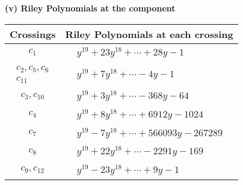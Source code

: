 \documentclass[1p]{elsarticle_modified}
\theoremstyle{definition}
\begin{document}
\newpage\renewcommand{\arraystretch}{1}
\flushleft \textbf{(v) Riley Polynomials at the component}\newline \\
\begin{tabular}{m{50pt}|m{274pt}}
Crossings & \hspace{64pt}Riley Polynomials at each crossing \\
\hline $$\begin{aligned}c_{1}\end{aligned}$$&$\begin{aligned}
&y^{19}+23 y^{18}+\cdots+28 y-1
\end{aligned}$\\
\hline $$\begin{aligned}c_{2},c_{5},c_{6}\\c_{11}\end{aligned}$$&$\begin{aligned}
&y^{19}+7 y^{18}+\cdots-4 y-1
\end{aligned}$\\
\hline $$\begin{aligned}c_{3},c_{10}\end{aligned}$$&$\begin{aligned}
&y^{19}+3 y^{18}+\cdots-368 y-64
\end{aligned}$\\
\hline $$\begin{aligned}c_{4}\end{aligned}$$&$\begin{aligned}
&y^{19}+8 y^{18}+\cdots+6912 y-1024
\end{aligned}$\\
\hline $$\begin{aligned}c_{7}\end{aligned}$$&$\begin{aligned}
&y^{19}-7 y^{18}+\cdots+566093 y-267289
\end{aligned}$\\
\hline $$\begin{aligned}c_{8}\end{aligned}$$&$\begin{aligned}
&y^{19}+22 y^{18}+\cdots-2291 y-169
\end{aligned}$\\
\hline $$\begin{aligned}c_{9},c_{12}\end{aligned}$$&$\begin{aligned}
&y^{19}-23 y^{18}+\cdots+9 y-1
\end{aligned}$\\
\hline
\end{tabular}\\~\\
\end{document}
